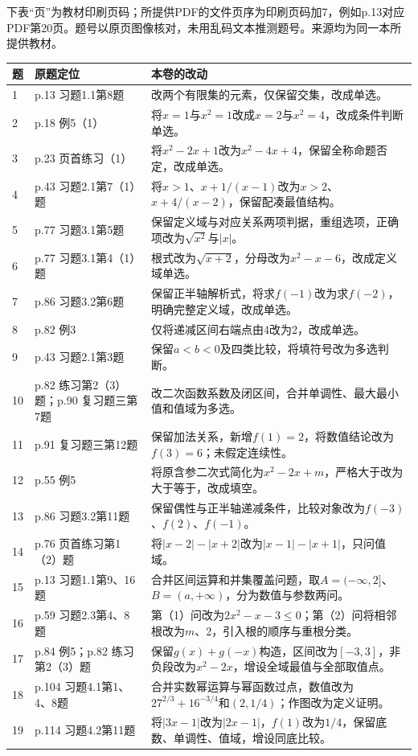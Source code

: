 \newpage
{}
下表“页”为教材印刷页码；所提供PDF的文件页序为印刷页码加7，例如p.13对应PDF第20页。题号以原页图像核对，未用乱码文本推测题号。来源均为同一本所提供教材。
{\small
\begin{longtable}{@{}p{.05\linewidth}p{.32\linewidth}p{.56\linewidth}@{}}
\toprule 题 & 原题定位 & 本卷的改动\\\midrule\endhead
1 & p.13 习题1.1第8题 & 改两个有限集的元素，仅保留交集，改成单选。\\
2 & p.18 例5（1） & 将$x=1$与$x^2=1$改成$x=2$与$x^2=4$，改成条件判断单选。\\
3 & p.23 页首练习（1） & 将$x^2-2x+1$改为$x^2-4x+4$，保留全称命题否定，改成单选。\\
4 & p.43 习题2.1第7（1）题 & 将$x>1$、$x+1/(x-1)$改为$x>2$、$x+4/(x-2)$，保留配凑最值结构。\\
5 & p.77 习题3.1第5题 & 保留定义域与对应关系两项判据，重组选项，正确项改为$\sqrt{x^2}$与$|x|$。\\
6 & p.77 习题3.1第4（1）题 & 根式改为$\sqrt{x+2}$，分母改为$x^2-x-6$，改成定义域单选。\\
7 & p.86 习题3.2第6题 & 保留正半轴解析式，将求$f(-1)$改为求$f(-2)$，明确完整定义域，改成单选。\\
8 & p.82 例3 & 仅将递减区间右端点由4改为2，改成单选。\\
9 & p.43 习题2.1第3题 & 保留$a<b<0$及四类比较，将填符号改为多选判断。\\
10 & p.82 练习第2（3）题；p.90 复习题三第7题 & 改二次函数系数及闭区间，合并单调性、最大最小值和值域为多选。\\
11 & p.91 复习题三第12题 & 保留加法关系，新增$f(1)=2$，将数值结论改为$f(3)=6$；未假定连续性。\\
12 & p.55 例5 & 将原含参二次式简化为$x^2-2x+m$，严格大于改为大于等于，改成填空。\\
13 & p.86 习题3.2第11题 & 保留偶性与正半轴递减条件，比较对象改为$f(-3)$、$f(2)$、$f(-1)$。\\
14 & p.76 页首练习第1（2）题 & 将$|x-2|-|x+2|$改为$|x-1|-|x+1|$，只问值域。\\
15 & p.13 习题1.1第9、16题 & 合并区间运算和并集覆盖问题，取$A=(-\infty,2]$、$B=(a,+\infty)$，分为数值与参数两问。\\
16 & p.59 习题2.3第4、8题 & 第（1）问改为$2x^2-x-3\le0$；第（2）问将相邻根改为$m$、2，引入根的顺序与重根分类。\\
17 & p.84 例5；p.82 练习第2（3）题 & 保留$g(x)+g(-x)$构造，区间改为$[-3,3]$，非负段改为$x^2-2x$，增设全域最值与全部取值点。\\
18 & p.104 习题4.1第1、4、8题 & 合并实数幂运算与幂函数过点，数值改为$27^{2/3}+16^{-3/4}$和$(2,1/4)$；作图改为定义证明。\\
19 & p.114 习题4.2第11题 & 将$|3x-1|$改为$|2x-1|$，$f(1)$改为$1/4$，保留底数、单调性、值域，增设同底比较。\\
\bottomrule
\end{longtable}}

